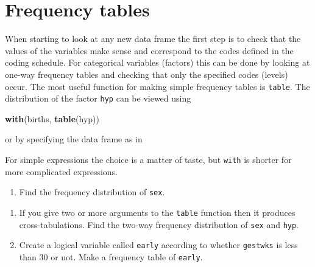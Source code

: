 \documentclass[
]{book}
\newenvironment{Shaded}{\begin{snugshade}}{\end{snugshade}}
\newcommand{\FunctionTok}[1]{\textcolor[rgb]{0.13,0.29,0.53}{\textbf{#1}}}
\newcommand{\NormalTok}[1]{#1}
\newcommand{\SpecialCharTok}[1]{\textcolor[rgb]{0.81,0.36,0.00}{\textbf{#1}}}
\providecommand{\tightlist}{%
  \setlength{\itemsep}{0pt}\setlength{\parskip}{0pt}}
\begin{document}
\section{Frequency tables}\label{frequency-tables}

When starting to look at any new data frame the first step is to check
that the values of the variables make sense and correspond to the
codes defined in the coding schedule. For categorical variables
(factors) this can be done by looking at one-way frequency tables and
checking that only the specified codes (levels) occur. The most
useful function for making simple frequency tables is \texttt{table}.
The distribution of the factor \texttt{hyp} can be viewed using

\begin{Shaded}
\begin{Highlighting}[]
\FunctionTok{with}\NormalTok{(births, }\FunctionTok{table}\NormalTok{(hyp))}
\end{Highlighting}
\end{Shaded}

or by specifying the data frame as in

\begin{Shaded}
\end{Shaded}

For simple expressions the choice is a matter of taste, but \texttt{with}
is shorter for more complicated expressions.

\begin{enumerate}
\def\labelenumi{\arabic{enumi}.}
\tightlist
\item
  Find the frequency distribution of \texttt{sex}.
\end{enumerate}

\begin{Shaded}
\end{Shaded}

\begin{enumerate}
\def\labelenumi{\arabic{enumi}.}
\setcounter{enumi}{1}
\item
  If you give two or more arguments to the \texttt{table} function
  then it produces cross-tabulations. Find the two-way frequency
  distribution of \texttt{sex} and \texttt{hyp}.
\item
  Create a logical variable called \texttt{early} according to whether \texttt{gestwks}
  is less than 30 or not. Make a frequency table of \texttt{early}.
\end{enumerate}
\end{document}
